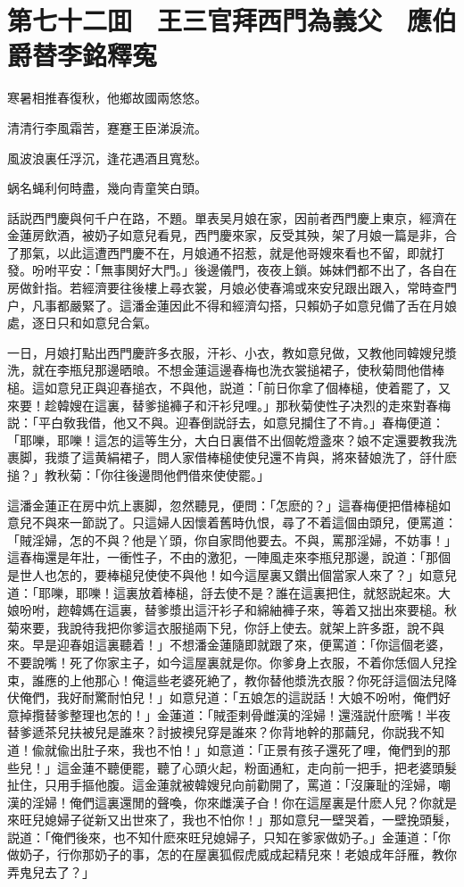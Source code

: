 \chapter*{第七十二囬　王三官拜西門為義父　應伯爵替李銘釋寃}

寒暑相推春復秋，他鄉故國兩悠悠。

清清行李風霜苦，蹇蹇王臣涕淚流。

風波浪裏任浮沉，逢花遇酒且寬愁。

蜗名蝇利何時盡，幾向青童笑白頭。

話説西門慶與何千户在路，不題。單表吴月娘在家，因前者西門慶上東京，經濟在金蓮房飲酒，被奶子如意兒看見，西門慶來家，反受其殃，架了月娘一篇是非，合了那氣，以此這遭西門慶不在，月娘通不招惹，就是他哥嫂來看也不留，即就打發。吩咐平安：「無事関好大門。」後邊儀門，夜夜上鎖。姊妹們都不出了，各自在房做針指。若經濟要往後樓上尋衣裳，月娘必使春鴻或來安兒跟出跟入，常時查門户，凡事都嚴緊了。這潘金蓮因此不得和經濟勾搭，只賴奶子如意兒備了舌在月娘處，逐日只和如意兒合氣。

一日，月娘打點出西門慶許多衣服，汗衫、小衣，教如意兒做，又教他同韓嫂兒漿洗，就在李瓶兒那邊晒㫰。不想金蓮這邊春梅也洗衣裳搥裙子，使秋菊問他借棒槌。這如意兒正與迎春搥衣，不與他，説道：「前日你拿了個棒槌，使着罷了，又來要！趁韓嫂在這裏，替爹搥褲子和汗衫兒哩。」那秋菊使性子决烈的走來對春梅説：「平白敎我借，他又不與。迎春倒説㧱去，如意兒攔住了不肯。」春梅便道：「耶嚛，耶嚛！這怎的這等生分，大白日裏借不出個乾燈盞來？娘不定還要教我洗裹脚，我漿了這黄絹裙子，問人家借棒槌使使兒還不肯與，將來替娘洗了，㧱什麽搥？」教秋菊：「你往後邊問他們借來使使罷。」

這潘金蓮正在房中炕上裹脚，忽然聽見，便問：「怎麽的？」這春梅便把借棒槌如意兒不與來一節説了。只這婦人因懷着舊時仇恨，尋了不着這個由頭兒，便罵道：「賊淫婦，怎的不與？他是丫頭，你自家問他要去。不與，罵那淫婦，不妨事！」這春梅還是年壯，一衝性子，不由的激犯，一陣風走來李瓶兒那邊，說道：「那個是世人也怎的，要棒槌兒使使不與他！如今這屋裏又鑽出個當家人來了？」如意兒道：「耶嚛，耶嚛！這裏放着棒槌，㧱去使不是？誰在這裏把住，就怒説起來。大娘吩咐，趂韓媽在這裏，替爹漿出這汗衫子和綿紬褲子來，等着又拙出來要槌。秋菊來要，我說待我把你爹這衣服搥兩下兒，你㧱上使去。就架上許多誑，說不與來。早是迎春姐這裏聽着！」不想潘金蓮隨即就跟了來，便罵道：「你這個老婆，不要說嘴！死了你家主子，如今這屋裏就是你。你爹身上衣服，不着你恁個人兒拴束，誰應的上他那心！俺這些老婆死絶了，教你替他漿洗衣服？你死㧱這個法兒降伏俺們，我好耐驚耐怕兒！」如意兒道：「五娘怎的這説話！大娘不吩咐，俺們好意掉攬替爹整理也怎的！」金蓮道：「賊歪剌骨雌漢的淫婦！還漒説什麽嘴！半夜替爹遞茶兒扶被兒是誰來？討披襖兒穿是誰來？你背地幹的那繭兒，你説我不知道！偸就偸出肚子來，我也不怕！」如意道：「正景有孩子還死了哩，俺們到的那些兒！」這金蓮不聽便罷，聽了心頭火起，粉面通紅，走向前一把手，把老婆頭髮扯住，只用手摳他腹。這金蓮就被韓嫂兒向前勸開了，罵道：「沒廉耻的淫婦，嘲漢的淫婦！俺們這裏還閒的聲喚，你來雌漢子㒲！你在這屋裏是什麽人兒？你就是來旺兒媳婦子従新又出世來了，我也不怕你！」那如意兒一壁哭着，一壁挽頭髮，説道：「俺們後來，也不知什麽來旺兒媳婦子，只知在爹家做奶子。」金蓮道：「你做奶子，行你那奶子的事，怎的在屋裏狐假虎威成起精兒來！老娘成年㧱雁，教你弄鬼兒去了？」

